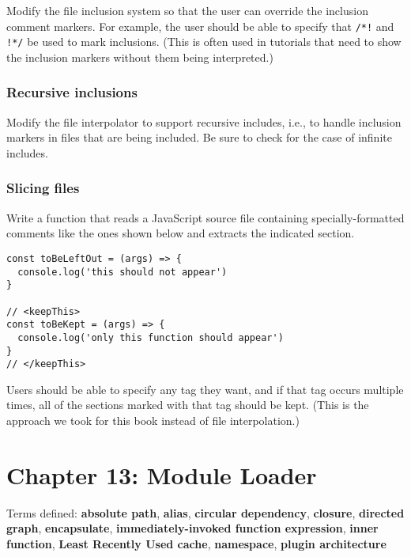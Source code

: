 \documentclass[krantzl]{krantz}
\newcommand{\glossref}[1]{\textbf{#1}}
\begin{document}
Modify the file inclusion system so that the user can override the inclusion comment markers.
For example, the user should be able to specify that \texttt{/*!} and \texttt{!*/} be used to mark inclusions.
(This is often used in tutorials that need to show the inclusion markers without them being interpreted.)

\subsection*{Recursive inclusions}


Modify the file interpolator to support recursive includes,
i.e.,
to handle inclusion markers in files that are being included.
Be sure to check for the case of infinite includes.

\subsection*{Slicing files}


Write a function that reads a JavaScript source file
containing specially-formatted comments like the ones shown below
and extracts the indicated section.

\begin{lstlisting}[frame=single,frameround=tttt]
const toBeLeftOut = (args) => {
  console.log('this should not appear')
}

// <keepThis>
const toBeKept = (args) => {
  console.log('only this function should appear')
}
// </keepThis>
\end{lstlisting}


Users should be able to specify any tag they want,
and if that tag occurs multiple times,
all of the sections marked with that tag should be kept.
(This is the approach we took for this book instead of file interpolation.)

\chapter{Chapter 13: Module Loader}\label{module-loader}


\noindent 
    Terms defined:
    \glossref{absolute path}, \glossref{alias}, \glossref{circular dependency}, \glossref{closure}, \glossref{directed graph}, \glossref{encapsulate}, \glossref{immediately-invoked function expression}, \glossref{inner function}, \glossref{Least Recently Used cache}, \glossref{namespace}, \glossref{plugin architecture}
\end{document}
